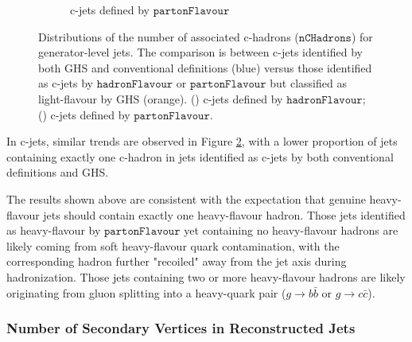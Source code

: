 \documentclass[10pt,twocolumn]{article}
\newcommand*{\parFlav}{\texttt{partonFlavour}}
\newcommand*{\hadFlav}{\texttt{hadronFlavour}}
\begin{document}
\begin{figure}[!htbp]
\begin{subfigure}[t]{0.48\textwidth}
        \caption{c-jets defined by $\parFlav$}
        \label{fig:GenJet_nCHad_full_c_parton_c}
    \end{subfigure}
    \caption{Distributions of the number of associated c-hadrons ($\texttt{nCHadrons}$) for generator-level jets. The comparison is between c-jets identified by both GHS and conventional definitions (blue) versus those identified as c-jets by $\hadFlav$ or $\parFlav$ but classified as light-flavour by GHS (orange). () c-jets defined by $\hadFlav$; () c-jets defined by $\parFlav$.}
    \label{fig:GenJet_nCHad}
\end{figure}

In c-jets, similar trends are observed in Figure \ref{fig:GenJet_nCHad}, with a lower proportion of jets containing exactly one c-hadron in jets identified as c-jets by both conventional definitions and GHS.

The results shown above are consistent with the expectation that genuine heavy-flavour jets should contain exactly one heavy-flavour hadron. Those jets identified as heavy-flavour by $\parFlav$ yet containing no heavy-flavour hadrons are likely coming from soft heavy-flavour quark contamination, with the corresponding hadron further "recoiled" away from the jet axis during hadronization. Those jets containing two or more heavy-flavour hadrons are likely originating from gluon splitting into a heavy-quark pair ($g \to b\bar{b}$ or $g \to c\bar{c}$).

\subsubsection{Number of Secondary Vertices in Reconstructed Jets}
\label{sec:vali-vars-nsv}
\end{document}

